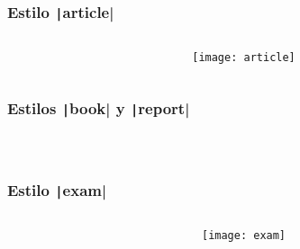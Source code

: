 \begin{frame}[fragile]
	\frametitle{Estilo \texttt|article|}

	\begin{columns}
		\begin{column}{.58\paperwidth}
			\inputminted[fontsize=\tiny,linenos,frame=single,escapeinside=||]{latex}{article} %
		\end{column}
		\pause
		\begin{column}{.38\paperwidth}
			\begin{figure}[ht!]
				\centering
				\texttt{[image: article]}
			\end{figure}
		\end{column}
	\end{columns}
\end{frame}


\begin{frame}[fragile]
	\frametitle{Estilos \texttt|book| y \texttt|report|}

	\begin{columns}
		\begin{column}{.48\paperwidth}
			\inputminted[fontsize=\tiny,linenos,frame=single,escapeinside=||]{latex}{book} %
		\end{column}
		\begin{column}{.48\paperwidth}
			\inputminted[fontsize=\tiny,linenos,frame=single,escapeinside=||]{latex}{report} %
		\end{column}
	\end{columns}
\end{frame}

\begin{frame}[fragile]
	\setbeamercovered{invisible}
	\frametitle{Estilo \texttt|exam|}

	\begin{columns}
		\begin{column}{.6\paperwidth}
			\inputminted[fontsize=\tiny,linenos,frame=single,escapeinside=||]{latex}{exam} %
		\end{column}
		\pause
		\begin{column}{.36\paperwidth}
			\begin{figure}[ht!]
				\centering
				\texttt{[image: exam]}
			\end{figure}
		\end{column}
	\end{columns}
\end{frame}

